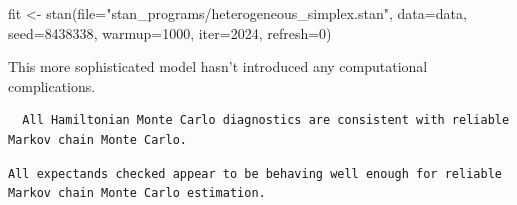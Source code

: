 \documentclass[
  letterpaper,
  DIV=11,
  numbers=noendperiod]{scrartcl}
\newenvironment{Shaded}{\begin{snugshade}}{\end{snugshade}}
\newcommand{\AttributeTok}[1]{\textcolor[rgb]{0.40,0.45,0.13}{#1}}
\newcommand{\ConstantTok}[1]{\textcolor[rgb]{0.56,0.35,0.01}{#1}}
\newcommand{\DecValTok}[1]{\textcolor[rgb]{0.68,0.00,0.00}{#1}}
\newcommand{\FunctionTok}[1]{\textcolor[rgb]{0.28,0.35,0.67}{#1}}
\newcommand{\NormalTok}[1]{\textcolor[rgb]{0.00,0.23,0.31}{#1}}
\newcommand{\OtherTok}[1]{\textcolor[rgb]{0.00,0.23,0.31}{#1}}
\newcommand{\SpecialCharTok}[1]{\textcolor[rgb]{0.37,0.37,0.37}{#1}}
\newcommand{\StringTok}[1]{\textcolor[rgb]{0.13,0.47,0.30}{#1}}
\begin{document}
\begin{Shaded}
\begin{Highlighting}[]
\NormalTok{fit }\OtherTok{\textless{}{-}} \FunctionTok{stan}\NormalTok{(}\AttributeTok{file=}\StringTok{"stan\_programs/heterogeneous\_simplex.stan"}\NormalTok{,}
            \AttributeTok{data=}\NormalTok{data, }\AttributeTok{seed=}\DecValTok{8438338}\NormalTok{,}
            \AttributeTok{warmup=}\DecValTok{1000}\NormalTok{, }\AttributeTok{iter=}\DecValTok{2024}\NormalTok{, }\AttributeTok{refresh=}\DecValTok{0}\NormalTok{)}
\end{Highlighting}
\end{Shaded}

This more sophisticated model hasn't introduced any computational
complications.

\begin{Shaded}
\end{Shaded}

\begin{verbatim}
  All Hamiltonian Monte Carlo diagnostics are consistent with reliable
Markov chain Monte Carlo.
\end{verbatim}

\begin{Shaded}
\end{Shaded}

\begin{verbatim}
All expectands checked appear to be behaving well enough for reliable
Markov chain Monte Carlo estimation.
\end{verbatim}
\end{document}
